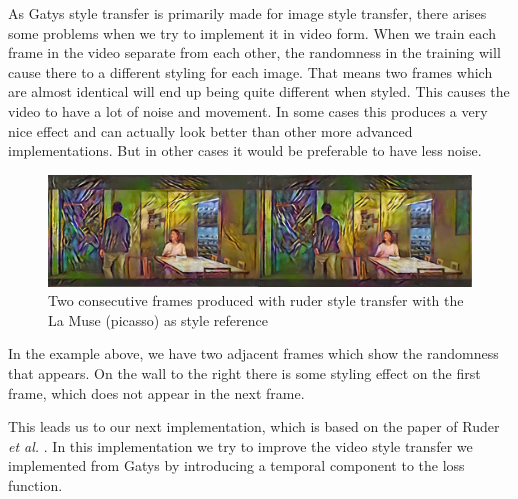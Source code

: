 As Gatys style transfer is primarily made for image style transfer, there arises some problems when we try to implement it in video form. When we train each frame in the video separate from each other, the randomness in the training will cause there to a different styling for each image. That means two frames which are almost identical will end up being quite different when styled. This causes the video to have a lot of noise and movement. In some cases this produces a very nice effect and can actually look better than other more advanced implementations. But in other cases it would be preferable to have less noise. \newline\newline

\begin{figure}[!ht]
\begin{center}
\includegraphics[scale=0.15]{report/Method/images/gatys_adjacent.png}
\caption{Two consecutive frames produced with ruder style transfer with the La Muse (picasso) as style reference}
\label{fig:Adjacent frames with ruder}
\end{center}
\end{figure}\newline
In the example above, we have two adjacent frames which show the randomness that appears. On the wall to the right there is some styling effect on the first frame, which does not appear in the next frame.

This leads us to our next implementation, which is based on the paper of Ruder \textit{et al.} \cite{Ruder:1}. In this implementation we try to improve the video style transfer we implemented from Gatys by introducing a temporal component to the loss function.